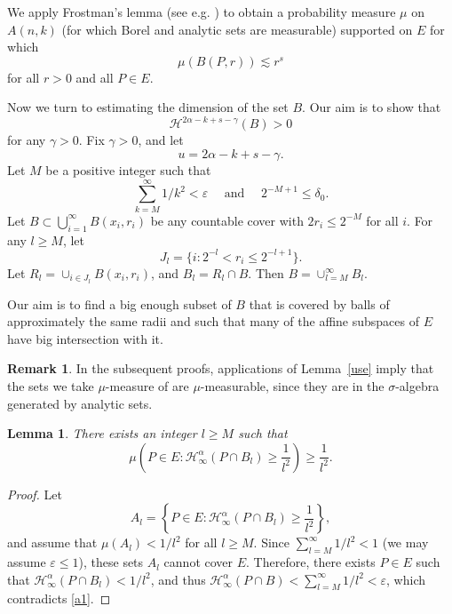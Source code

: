 \documentclass[a4paper]{amsart}
\newtheorem{lemma}[theorem]{Lemma}
\theoremstyle{definition} \newtheorem{remark}[theorem]{Remark}
\def\su{\subset}
\def\al{\alpha}
\def\ga{\gamma}
\def\de{\delta}
\def\ep{\varepsilon}
\def\hau{\mathcal{H}}
\begin{document}
We apply Frostman's lemma (see e.g. \cite{Ma}) 
to obtain a probability measure $\mu$ on $A(n,k)$ (for which Borel and analytic sets are measurable) supported on $E$
for which
\begin{equation}
\label{Frost}
\mu (B(P,r)) \lesssim r^s 
\end{equation}
for all $r>0$ and all $P \in E$. 

\def\eps{\ep}



Now we turn to estimating the dimension of the set $B$. Our aim is to show that
$$\hau^{2 \al-k+s-\ga}(B)>0$$
for any $\ga >0$. Fix $\ga>0$, and let $$u=2 \al-k+s-\ga.$$
Let $M$ be a positive integer such that
$$\sum_{k=M}^\infty 1/k^2 < \ep \quad \text{ and }\quad 2^{-M+1} \leq \de_0.$$ %
Let $B \su \bigcup_{i=1}^{\infty} B(x_i,r_i)$ be any countable cover with $2 r_i \leq 2^{-M}$ for all $i$.
For any $l \geq M$, let 
$$J_l=\{ i : 2^{-l} < r_i \leq 2^{-l+1} \}.$$ 
Let $R_l=\cup_{i \in J_l} B(x_i,r_i)$, and $B_l=R_l \cap B$. Then $B=\cup_{l=M}^{\infty} B_l$. 

Our aim is to find a big enough subset of $B$ that is covered by balls of approximately the same radii and such that many of the affine subspaces of $E$ have big intersection with it. 

\begin{remark}
\label{meas}
In the subsequent proofs, applications of Lemma~\ref{use} imply that the sets we take $\mu$-measure of are $\mu$-measurable, since they are in the $\sigma$-algebra generated by analytic sets. 
\end{remark}

\def\rc{l}

\begin{lemma}
\label{prob2}
There exists an integer $\rc \geq M$ such that 
\begin{equation}
\label{B_l}
\mu\left(P \in E \colon \hau^{\al}_{\infty}(P \cap B_{\rc}) \geq 
\frac{1}{\rc^2 }\right) \geq \frac{1}{\rc^2 }.
\end{equation}
\end{lemma}

\begin{proof}
Let $$A_l=\left\{P \in E \colon \hau^{\al}_{\infty}(P \cap B_{l}) \geq \frac{1}{\rc^2}\right\},$$ and 
assume that $\mu(A_{\rc}) < 1/{\rc}^2$ for all ${\rc} \geq M$.  
Since $\sum_{l=M}^\infty 1/l^2 < 1$ (we may assume $\ep\le 1$), these sets $A_{\rc}$ cannot cover $E$. Therefore, there exists $P\in E$
such that $\hau^{\al}_{\infty}(P \cap B_{\rc})< 1/l^2$, and thus
$\hau^{\al}_{\infty}(P \cap B)< \sum_{l=M}^\infty 1/l^2<\eps$, which contradicts \eqref{a1}.
\end{proof}
\end{document}
